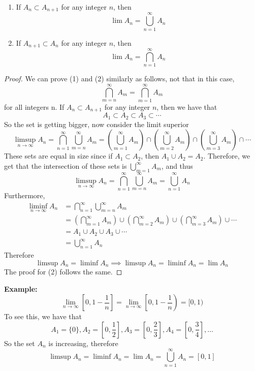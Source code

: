 \documentclass[openany]{report}
\begin{document}
\begin{lemma}
    \[\]
    \begin{enumerate}
        \item If $A_n \subset A_{n+1}$ for any integer $n$, then 
        \[\lim A_n = \bigcup_{n=1}^\infty A_n\]
        \item If $A_{n+1} \subset A_n$ for any integer $n$, then
        \[\lim A_n = \bigcap_{n=1}^\infty A_n\]
    \end{enumerate}
\end{lemma}
\begin{proof}
    We can prove (1) and (2) similarly as follows, not that in this case, 
    \[\bigcap_{m=n}^\infty A_m = \bigcap_{m=1}^\infty A_m\]
    for all integers n. If $A_n \subset A_{n+1}$ for any integer $n$, then we have that 
    \[A_1 \subset A_2 \subset A_3 \subset \cdots \]
    So the set is getting bigger, now consider the limit superior 
    \[\limsup_{n\rightarrow\infty} A_n = \bigcap_{n=1}^\infty \bigcup_{m=n}^\infty A_m= \left(\bigcup_{m=1}^\infty A_m\right) \cap \left(\bigcup_{m=2}^\infty A_m\right) \cap \left(\bigcup_{m=3}^\infty A_m\right) \cap \cdots\]
    These sets are equal in size since if $A_1 \subset A_2$, then $A_1 \cup A_2 = A_2$. Therefore, we get that the intersection of these sets is $\bigcup\limits_{m=1}^\infty A_m$, and thus 
    \[\limsup_{n\rightarrow \infty} A_n = \bigcap_{n=1}^\infty\bigcup_{m=n}^\infty A_m = \bigcup_{n=1}^\infty A_n\]
    Furthermore, 
    \begin{align*}
        \liminf_{n\rightarrow\infty} A_n &= \bigcap_{n=1}^\infty \bigcup_{m=n}^\infty A_m\\
        &= \left(\bigcap_{m=1}^\infty A_m\right) \cup \left(\bigcap_{m=2}^\infty A_m\right) \cup \left(\bigcap_{m=3}^\infty A_m\right) \cup \cdots \\
        &=  A_1 \cup A_2 \cup A_3 \cup \cdots \\
        &= \bigcup_{n=1}^\infty A_n
    \end{align*}
    Therefore 
    \[\limsup A_n = \liminf A_n \implies \limsup A_n = \liminf A_n = \lim A_n\]
    The proof for (2) follows the same. 
\end{proof}
\noindent
\textbf{Example:} 
\[\lim_{n\rightarrow\infty} \left[0, 1 - \frac{1}{n}\right] = \lim_{n\rightarrow\infty} \left[0, 1 - \frac{1}{n}\right) = [0,1)\]
To see this, we have that 
\[A_1 = \{0\}, A_2 = \left[0,\frac{1}{2}\right], A_3 = \left[0,\frac{2}{3}\right],A_4 = \left[0,\frac{3}{4}\right], \ldots \]
So the set $A_n$ is increasing, therefore 
\[\limsup A_n = \liminf A_n = \lim A_n = \bigcup_{n=1}^\infty A_n = [0,1]\]
\end{document}
